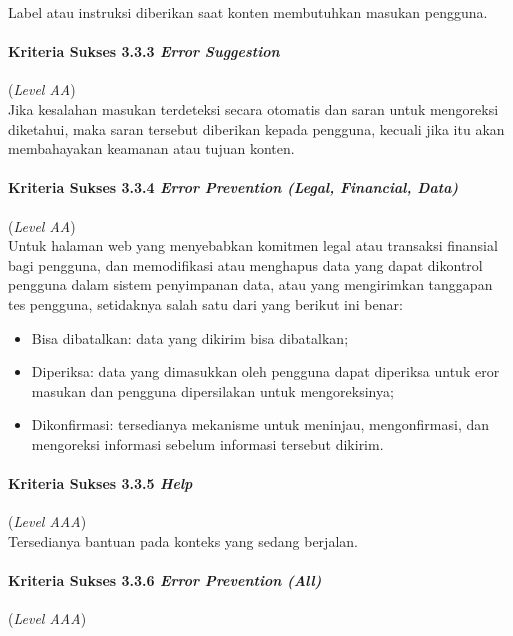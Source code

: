 Label atau instruksi diberikan saat konten membutuhkan masukan pengguna.

\paragraph{Kriteria Sukses 3.3.3 \textit{Error Suggestion}}
\label{subsec:kriteria_3.3.3}
(\textit{Level AA}) \\

Jika kesalahan masukan terdeteksi secara otomatis dan saran untuk mengoreksi diketahui, maka saran tersebut diberikan kepada pengguna, kecuali jika itu akan membahayakan keamanan atau tujuan konten.

\paragraph{Kriteria Sukses 3.3.4 \textit{Error Prevention (Legal, Financial, Data)}}
\label{subsec:kriteria_3.3.4}
(\textit{Level AA}) \\

Untuk halaman web yang menyebabkan komitmen legal atau transaksi finansial bagi pengguna, dan memodifikasi atau menghapus data yang dapat dikontrol pengguna dalam sistem penyimpanan data, atau yang mengirimkan tanggapan tes pengguna, setidaknya salah satu dari yang berikut ini benar:

\begin{itemize}
	\item Bisa dibatalkan: data yang dikirim bisa dibatalkan;
	\item Diperiksa: data yang dimasukkan oleh pengguna dapat diperiksa untuk eror masukan dan pengguna dipersilakan untuk mengoreksinya;
	\item Dikonfirmasi: tersedianya mekanisme untuk meninjau, mengonfirmasi, dan mengoreksi informasi sebelum informasi tersebut dikirim.
\end{itemize}


\paragraph{Kriteria Sukses 3.3.5 \textit{Help}}
\label{subsec:kriteria_3.3.5}
(\textit{Level AAA}) \\

Tersedianya bantuan pada konteks yang sedang berjalan.


\paragraph{Kriteria Sukses 3.3.6 \textit{Error Prevention (All)}}
\label{subsec:kriteria_3.3.6}
(\textit{Level AAA}) \\

